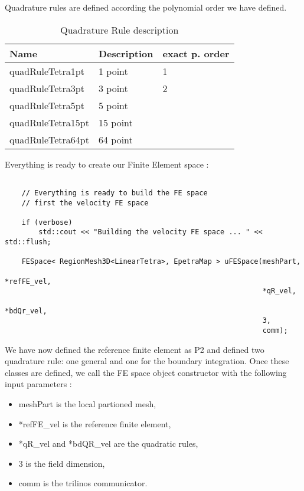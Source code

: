 {Quadrature rules  are defined according the polynomial order we have defined.

\begin{table}
\begin{center}
\begin{tabular}{|l|l|l|}
\hline
Name  & Description & exact p. order\\
\hline \hline
quadRuleTetra1pt   & 1 point & 1 \\
quadRuleTetra3pt   & 3 point & 2 \\
quadRuleTetra5pt   & 5 point &   \\
quadRuleTetra15pt  & 15 point &  \\
quadRuleTetra64pt  & 64 point &  \\
\hline
\end{tabular}
\end{center}
\caption{ Quadrature Rule description}
\label{table-feapproxorder}
\end{table}

Everything is ready to create our Finite Element space :

\begin{verbatim}

    // Everything is ready to build the FE space
    // first the velocity FE space

    if (verbose)
        std::cout << "Building the velocity FE space ... " << std::flush;

    FESpace< RegionMesh3D<LinearTetra>, EpetraMap > uFESpace(meshPart,
                                                             *refFE_vel,
                                                             *qR_vel,
                                                             *bdQr_vel,
                                                             3,
                                                             comm);

\end{verbatim}

We have now defined the reference finite element as P2 and defined two quadrature rule: one general and one
for the boundary integration. Once these classes are defined, we call the FE space
object constructor with the following input parameters :
\begin{itemize}
\item meshPart is the local partioned mesh,
\item *refFE\_vel is the reference finite element,
\item *qR\_vel and *bdQR\_vel are the quadratic rules,
\item 3 is the field dimension,
\item comm is the trilinos communicator.
\end{itemize}

}
